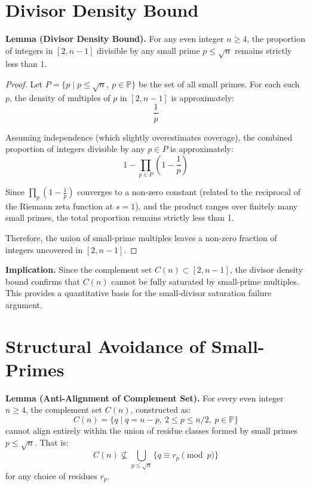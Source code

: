\documentclass[11pt]{article}
\begin{document}
	
	\section{Divisor Density Bound}
	
	\textbf{Lemma (Divisor Density Bound).}  
	For any even integer \( n \geq 4 \), the proportion of integers in \([2, n-1]\) divisible by any small prime \( p \leq \sqrt{n} \) remains strictly less than 1.
	
	\begin{proof}
		Let \( P = \{ p \mid p \leq \sqrt{n},\ p \in \mathbb{P} \} \) be the set of all small primes. For each such \( p \), the density of multiples of \( p \) in \([2, n-1]\) is approximately:
		\[
		\frac{1}{p}
		\]
		
		Assuming independence (which slightly overestimates coverage), the combined proportion of integers divisible by any \( p \in P \) is approximately:
		\[
		1 - \prod_{p \in P} \left(1 - \frac{1}{p}\right)
		\]
		
		Since \( \prod_{p} \left(1 - \frac{1}{p}\right) \) converges to a non-zero constant (related to the reciprocal of the Riemann zeta function at \( s = 1 \)), and the product ranges over finitely many small primes, the total proportion remains strictly less than 1.
		
		Therefore, the union of small-prime multiples leaves a non-zero fraction of integers uncovered in \([2, n-1]\).
		
	\end{proof}
	
	\textbf{Implication.}  
	Since the complement set \( C(n) \subset [2, n-1] \), the divisor density bound confirms that \( C(n) \) cannot be fully saturated by small-prime multiples. This provides a quantitative basis for the small-divisor saturation failure argument.
	
	
	\section{Structural Avoidance of Small-Primes}
	
	\textbf{Lemma (Anti-Alignment of Complement Set).}  
	For every even integer \( n \geq 4 \), the complement set \( C(n) \), constructed as:
	\[
	C(n) = \{ q \mid q = n - p,\ 2 \leq p \leq n/2,\ p \in \mathbb{P} \}
	\]
	cannot align entirely within the union of residue classes formed by small primes \( p \leq \sqrt{n} \). That is:
	\[
	C(n) \not\subseteq \bigcup_{p \leq \sqrt{n}} \{ q \equiv r_p \pmod{p} \}
	\]
	for any choice of residues \( r_p \).
	
\end{document}
